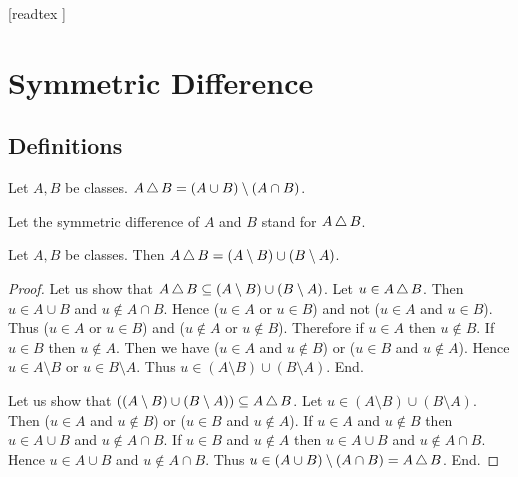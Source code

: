 \documentclass[10pt]{article}
\begin{document}
  \begin{imports}
    \begin{forthel}
      [readtex ]
    \end{forthel}
  \end{imports}


  \section*{Symmetric Difference}

  \subsection*{Definitions}

  \begin{forthel}
    \begin{definition}
      Let $A, B$ be classes.
      $A \mathop{\triangle} B = (A \cup B) \setminus (A \cap B)$.
    \end{definition}

    Let the symmetric difference of $A$ and $B$ stand for $A \mathop{\triangle} B$.
  \end{forthel}

  \begin{forthel}
    \begin{proposition}
      Let $A, B$ be classes.
      Then $A \mathop{\triangle} B = (A \setminus B) \cup (B \setminus A)$.
    \end{proposition}
    \begin{proof}
      Let us show that $A \mathop{\triangle} B \subseteq (A \setminus B) \cup (B \setminus A)$.
        Let $u \in A \mathop{\triangle} B$.
        Then $u \in A \cup B$ and $u \notin A \cap B$.
        Hence ($u \in A$ or $u \in B$) and not ($u \in A$ and $u \in B$).
        Thus ($u \in A$ or $u \in B$) and ($u \notin A$ or $u \notin B$).
        Therefore if $u \in A$ then $u \notin B$.
        If $u \in B$ then $u \notin A$.
        Then we have ($u \in A$ and $u \notin B$) or ($u \in B$ and $u \notin A$).
        Hence $u \in A \setminus B$ or $u \in B \setminus A$.
        Thus $u \in (A \setminus B) \cup (B \setminus A)$.
      End.

      Let us show that $((A \setminus B) \cup (B \setminus A)) \subseteq A \mathop{\triangle} B$. %
        Let $u \in (A \setminus B) \cup (B \setminus A)$.
        Then ($u \in A$ and $u \notin B$) or ($u \in B$ and $u \notin A$).
        If $u \in A$ and $u \notin B$ then $u \in A \cup B$ and $u \notin A \cap B$.
        If $u \in B$ and $u \notin A$ then $u \in A \cup B$ and $u \notin A \cap B$.
        Hence $u \in A \cup B$ and $u \notin A \cap B$.
        Thus $u \in (A \cup B) \setminus (A \cap B) = A \mathop{\triangle} B$.
      End.
    \end{proof}
  \end{forthel}
\end{document}
